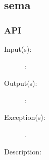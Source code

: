 %
%
%
%
%              

\subsection{sema}
\label{sema}

\subsubsection{API}
\begin{description}
\label{sema_}
\item[{\cfunc[]{sema\_}{}}: ]
	\begin{description}\item[]
	\item[Input(s): ]
		\begin{description}\item[]
		\item[: ]
		\end{description}
	\item[Output(s): ]
		\begin{description}\item[]
		\item[: ]
		\end{description}
	\item[Exception(s): ]
		\begin{description}\item[]
		\item[.]
		\end{description}
	\item[Description: ]
	\end{description}
\end{description}
